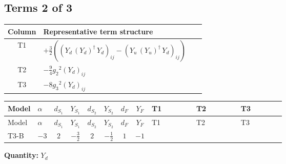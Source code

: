 \documentclass[8pt]{article}
\begin{document}
\begin{landscape}
\subsection*{Terms 2 of 3}
\begin{center}
\begin{tabular}{@{}c >{\raggedright\arraybackslash}p{0.82\linewidth}@{}}
\toprule
Column & Representative term structure \\
\midrule
T1 & \(\displaystyle +\frac{3}{2} (\left({Y_d}\,\left({Y_d}\right)^{\dagger}\,{Y_d}\right)_{ij}-\left({Y_u}\,\left({Y_u}\right)^{\dagger}\,{Y_d}\right)_{ij})\) \\
\midrule
T2 & \(\displaystyle -\frac{9}{4} {g_2}^2 \left({Y_d}\right)_{ij}\) \\
\midrule
T3 & \(\displaystyle -8 {g_3}^2 \left({Y_d}\right)_{ij}\) \\
\midrule
\bottomrule
\end{tabular}
\end{center}
\smallskip
\tiny
\begin{longtable}{@{}llcccccc >{\raggedright\arraybackslash}p{0.21\linewidth} >{\raggedright\arraybackslash}p{0.21\linewidth} >{\raggedright\arraybackslash}p{0.21\linewidth}@{}}
\toprule
Model & $\alpha$ & $d_{S_1}$ & $Y_{S_1}$ & $d_{S_2}$ & $Y_{S_2}$ & $d_F$ & $Y_F$ & T1 & T2 & T3 \\
\midrule
\endfirsthead
\toprule
Model & $\alpha$ & $d_{S_1}$ & $Y_{S_1}$ & $d_{S_2}$ & $Y_{S_2}$ & $d_F$ & $Y_F$ & T1 & T2 & T3 \\
\midrule
\endhead
T3-B & $-3$ & $2$ & $-\frac{3}{2}$ & $2$ & $-\frac{1}{2}$ & $1$ & $-1$ & \scriptsize\adjustbox{max width=\linewidth}{$\begin{gathered} +\frac{3}{2} (\left({Y_d}\,\left({Y_d}\right)^{\dagger}\,{Y_d}\right)_{ij}-\left({Y_u}\,\left({Y_u}\right)^{\dagger}\,{Y_d}\right)_{ij})\end{gathered}$} & \scriptsize\adjustbox{max width=\linewidth}{$\begin{gathered} -\frac{9}{4} {g_2}^2 \left({Y_d}\right)_{ij}\end{gathered}$} & \scriptsize\adjustbox{max width=\linewidth}{$\begin{gathered} -8 {g_3}^2 \left({Y_d}\right)_{ij}\end{gathered}$} \\
\midrule
\bottomrule
\end{longtable}
\clearpage
\noindent\textbf{Quantity: }$Y_d$\par\smallskip

\end{landscape}
\end{document}
